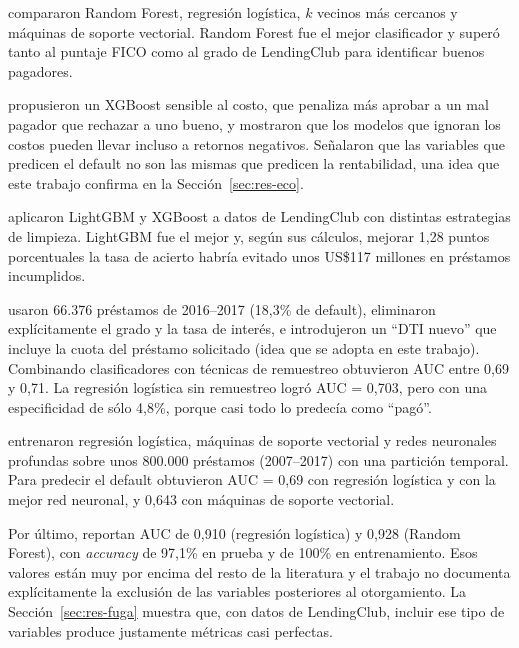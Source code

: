 \documentclass{article}
\begin{document}
\citet{malekipirbazari2015} compararon Random Forest, regresión logística, $k$
vecinos más cercanos y máquinas de soporte vectorial. Random Forest fue el mejor
clasificador y superó tanto al puntaje FICO como al grado de LendingClub para
identificar buenos pagadores.

\citet{xia2017} propusieron un XGBoost sensible al costo, que penaliza más
aprobar a un mal pagador que rechazar a uno bueno, y mostraron que los modelos
que ignoran los costos pueden llevar incluso a retornos negativos. Señalaron que
las variables que predicen el default no son las mismas que predicen la
rentabilidad, una idea que este trabajo confirma en la Sección~\ref{sec:res-eco}.

\citet{ma2018} aplicaron LightGBM y XGBoost a datos de LendingClub con distintas
estrategias de limpieza. LightGBM fue el mejor y, según sus cálculos, mejorar 1,28
puntos porcentuales la tasa de acierto habría evitado unos US\$117 millones en
préstamos incumplidos.

\citet{namvar2018} usaron 66.376 préstamos de 2016--2017 (18,3\% de default),
eliminaron explícitamente el grado y la tasa de interés, e introdujeron un
``DTI nuevo'' que incluye la cuota del préstamo solicitado (idea que se adopta en
este trabajo). Combinando clasificadores con técnicas de remuestreo obtuvieron
AUC entre 0,69 y 0,71. La regresión logística sin remuestreo logró AUC = 0,703,
pero con una especificidad de sólo 4,8\%, porque casi todo lo predecía como
``pagó''.

\citet{turiel2020} entrenaron regresión logística, máquinas de soporte vectorial y
redes neuronales profundas sobre unos 800.000 préstamos (2007--2017) con una
partición temporal. Para predecir el default obtuvieron AUC = 0,69 con regresión
logística y con la mejor red neuronal, y 0,643 con máquinas de soporte vectorial.

Por último, \citet{gupta2022} reportan AUC de 0,910 (regresión logística) y
0,928 (Random Forest), con \emph{accuracy} de 97,1\% en prueba y de 100\% en
entrenamiento. Esos valores están muy por encima del resto de la literatura y el
trabajo no documenta explícitamente la exclusión de las variables posteriores al
otorgamiento. La Sección~\ref{sec:res-fuga} muestra que, con datos de LendingClub,
incluir ese tipo de variables produce justamente métricas casi perfectas.
\end{document}
